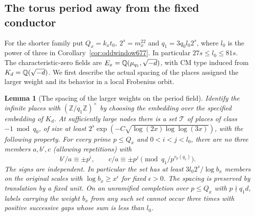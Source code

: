 \documentclass[a4paper,11pt]{article}
\newtheorem{lemma}[proposition]{Lemma}
\theoremstyle{definition}
\theoremstyle{remark}
\newcommand{\ZZ}{\mathbb Z}\newcommand{\ord}{\operatorname{ord}}
\numberwithin{equation}{section}
\begin{document}
\subsection{The torus period away from the fixed conductor}
\label{sec:fixedconductor781}
For the shorter family put \(Q_x=k_x t_0,\ 2^s=m_x^{22}\)
and \(q_1=3q_0l_0 2^s\), where \(l_0\) is the power of
three in Corollary~\ref{cor:oddwindow677}. In particular
\(27s\le l_0\le81s\). The characteristic-zero fields are
\(E_x=\mathbb Q(\mu_{q_1},\sqrt{-d})\), with CM type induced
from \(K_d=\mathbb Q(\sqrt{-d})\). We first describe the actual
spacing of the places assigned the larger weight and its
behavior in a local Frobenius orbit.

\begin{lemma}[The spacing of the larger weights on the period field]
\leavevmode\label{lem:spacing781}
Identify the infinite places with \((\ZZ/q_1\ZZ)^\times\)
by choosing the embedding over the specified embedding
of \(K_d\). At sufficiently large nodes there is a set
\(\mathcal T\) of places of class \(-1\bmod q_0\), of size
at least \(2^s\exp(-C\sqrt{\log(2x)\log\log(3x)})\),
with the following property. For every prime \(p\le Q_x\)
and \(0<i<j<l_0\), there are no three members \(a,b',c\)
(allowing repetitions) with
\[
   b'/a\equiv\pm p^i,\qquad c/a\equiv\pm p^j
                   \pmod {q_1/p^{v_p(q_1)}}.
\]
The signs are independent. In particular the set has at
least \(3l_0 2^s/\log b_x\) members on the original
scales with \(\log b_x\ge x^\epsilon\) for fixed
\(\epsilon>0\). The spacing is preserved by translation
by a fixed unit. On an unramified completion over \(p\le Q_x\)
with \(p\nmid q_1 d\), labels carrying the weight \(b_x\)
from any such set cannot occur three times with positive
successive gaps whose sum is less than \(l_0\).
\end{lemma}
\end{document}

